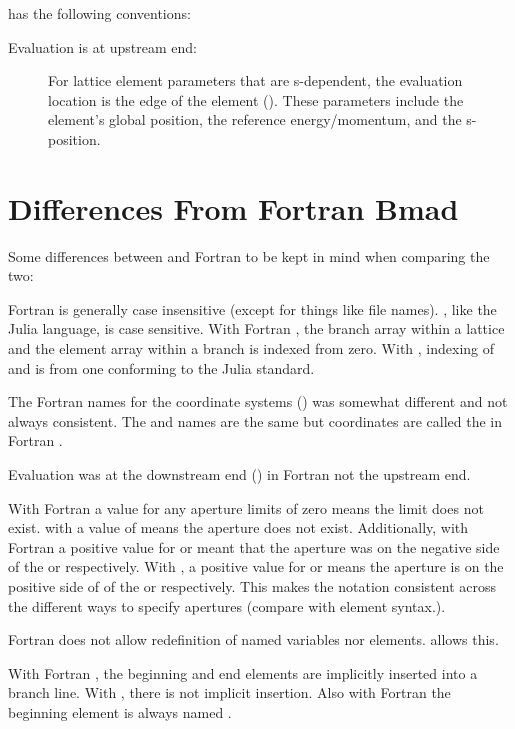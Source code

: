\accellat has the following conventions:
\begin{description}
%
\item[Evaluation is at upstream end:] 
For lattice element parameters that are s-dependent, the evaluation location is the
 edge of the element (). These parameters include the 
element's global position, the reference energy/momentum, and the s-position.
%
\end{description}


\section{Differences From Fortran Bmad}

Some differences between \accellat and Fortran \bmad to
be kept in mind when comparing the two:
\begin{description}
\item
Fortran \bmad is generally case insensitive (except for things like file names). \accellat, like
the Julia language, is case sensitive.
%
With Fortran \bmad, the branch array within a lattice and the element array within a branch is
indexed from zero. With \bmadjl, indexing of  and  is 
from one conforming to the Julia standard.
%
\item
The Fortran \bmad names for the coordinate systems () was somewhat different and not
always consistent. The  and  names are the same but 
coordinates are called the  in Fortran \bmad.
%
\item
Evaluation was at the downstream end () in Fortran \bmad not the upstream end.
%
\item
With Fortran \bmad a value for any aperture limits of zero means the limit does not exist.
with \accellat a value of  means the aperture does not exist. Additionally, with
Fortran \bmad a positive value for  or  meant that the aperture was
on the negative side of the  or  respectively. With \accellat, a positive
value for  or  means the aperture is on the positive side of 
of the  or  respectively. This makes the notation consistent across 
the different ways to specify apertures (compare with  element syntax.).
%
\item
Fortran \bmad does not allow redefinition of named variables nor elements. \accellat allows this.
%
\item
With Fortran \bmad, the beginning and end elements are implicitly inserted into a branch line.
With \accellat, there is not implicit insertion. Also with Fortran \bmad the beginning element
is always named . 
%
\end{description}



